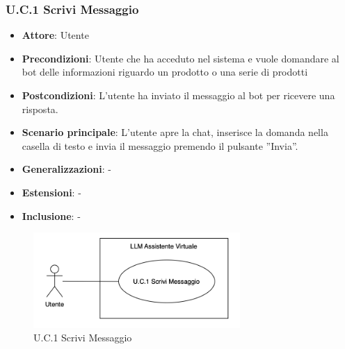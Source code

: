 \subsubsection{U.C.1 Scrivi Messaggio}
\begin{itemize}
    \item \textbf{Attore}: Utente
    \item \textbf{Precondizioni}: Utente che ha acceduto nel sistema e vuole domandare al bot delle informazioni riguardo un prodotto o una serie di prodotti
    \item \textbf{Postcondizioni}: L'utente ha inviato il messaggio al bot per ricevere una risposta.  
    \item \textbf{Scenario principale}: L’utente apre la chat, inserisce la domanda nella casella di testo e invia il messaggio premendo il pulsante ”Invia”.
    \item \textbf{Generalizzazioni}: -
    \item \textbf{Estensioni}: -
    \item \textbf{Inclusione}: -
\end{itemize}
\begin{figure}[H]
    \centering
    \includegraphics[width=0.7\textwidth]{img/UC1.png}
    \caption{U.C.1 Scrivi Messaggio}
\end{figure}
\newpage

